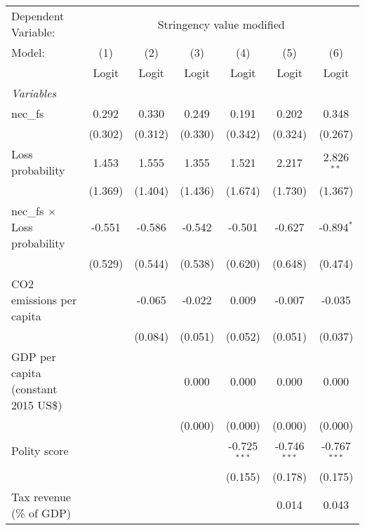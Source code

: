 
\begingroup
\centering
\begin{tabular}{lcccccc}
   \toprule
   Dependent Variable: & \multicolumn{6}{c}{Stringency value modified}\\
   Model:                               & (1)     & (2)     & (3)     & (4)            & (5)            & (6)\\  
                                        &  Logit  & Logit   & Logit   & Logit          & Logit          & Logit\\  
   \midrule
   \emph{Variables}\\
   nec\_fs                              & 0.292   & 0.330   & 0.249   & 0.191          & 0.202          & 0.348\\   
                                        & (0.302) & (0.312) & (0.330) & (0.342)        & (0.324)        & (0.267)\\   
   Loss probability                     & 1.453   & 1.555   & 1.355   & 1.521          & 2.217          & 2.826$^{**}$\\   
                                        & (1.369) & (1.404) & (1.436) & (1.674)        & (1.730)        & (1.367)\\   
   nec\_fs $\times$ Loss probability    & -0.551  & -0.586  & -0.542  & -0.501         & -0.627         & -0.894$^{*}$\\   
                                        & (0.529) & (0.544) & (0.538) & (0.620)        & (0.648)        & (0.474)\\   
   CO2 emissions per capita             &         & -0.065  & -0.022  & 0.009          & -0.007         & -0.035\\   
                                        &         & (0.084) & (0.051) & (0.052)        & (0.051)        & (0.037)\\   
   GDP per capita (constant 2015 US\$)  &         &         & 0.000   & 0.000          & 0.000          & 0.000\\   
                                        &         &         & (0.000) & (0.000)        & (0.000)        & (0.000)\\   
   Polity score                         &         &         &         & -0.725$^{***}$ & -0.746$^{***}$ & -0.767$^{***}$\\   
                                        &         &         &         & (0.155)        & (0.178)        & (0.175)\\   
   Tax revenue (\% of GDP)              &         &         &         &                & 0.014          & 0.043\\   

\end{tabular}
